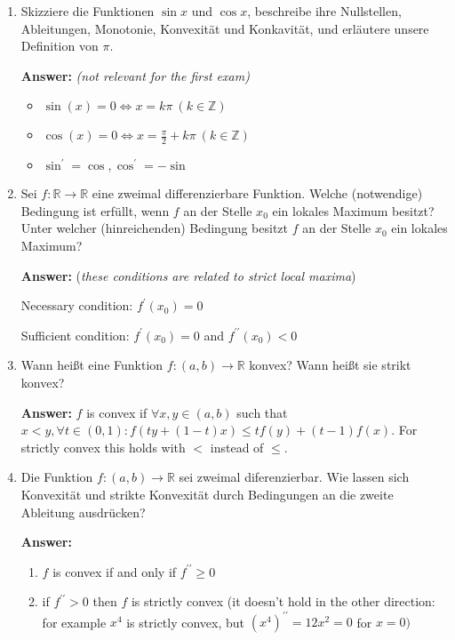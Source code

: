 \documentclass[11pt]{article}
\newcommand{\RR}[0]{\mathbb{R}}
\newcommand{\ZZ}[0]{\mathbb{Z}}
\begin{document}
\begin{enumerate}
    
    \item Skizziere die Funktionen $\sin{x}$ und $\cos{x}$, beschreibe ihre Nullstellen, Ableitungen, Monotonie, Konvexität und Konkavität, und erläutere unsere Definition von $\pi$.

    \textbf{Answer:} \textit{(not relevant for the first exam)}
    \begin{itemize}
        \item $\sin(x) = 0 \Leftrightarrow x = k\pi~(k \in \ZZ)$
        \item $\cos(x) = 0 \Leftrightarrow x = \frac{\pi}{2} + k\pi~(k \in \ZZ)$
        \item $\sin^\prime = \cos, \cos^\prime = -\sin$
    \end{itemize}
    


    \item Sei $f\colon \RR\to\RR$ eine zweimal differenzierbare Funktion. Welche (notwendige) Bedingung ist erfüllt, wenn $f$ an der Stelle $x_0$ ein lokales Maximum besitzt? Unter welcher (hinreichenden) Bedingung besitzt $f$ an der Stelle $x_0$ ein lokales Maximum?
    
    \textbf{Answer:} (\textit{these conditions are related to strict local maxima})

    Necessary condition: $f^\prime(x_0) = 0$

    Sufficient condition: $f^\prime(x_0) = 0$ and $f^{\prime\prime}(x_0) < 0$

    \item Wann heißt eine Funktion $f\colon (a, b)\to\RR$ konvex? Wann heißt sie strikt konvex?
    
    \textbf{Answer:} $f$ is convex if $\forall x, y \in (a, b)$ such that $x < y, \forall t \in (0, 1)\colon f(t y + (1-t) x) \le tf(y) + (t-1)f(x)$. For strictly convex this holds with $<$ instead of $\le$.
    \item Die Funktion $f\colon (a, b)\to\RR$ sei zweimal diferenzierbar. Wie lassen sich Konvexität
    und strikte Konvexität durch Bedingungen an die zweite Ableitung ausdrücken?

    \textbf{Answer:} 
    \begin{enumerate}
        \item $f$ is convex if and only if $f^{\prime\prime} \ge 0$
        \item if $f^{\prime\prime} > 0$ then $f$ is strictly convex (it doesn't hold in the other direction: for example $x^4$ is strictly convex, but $(x^4)^{\prime\prime} = 12x^2 = 0$ for $x=0)$
    \end{enumerate}


\end{enumerate}
\end{document}
